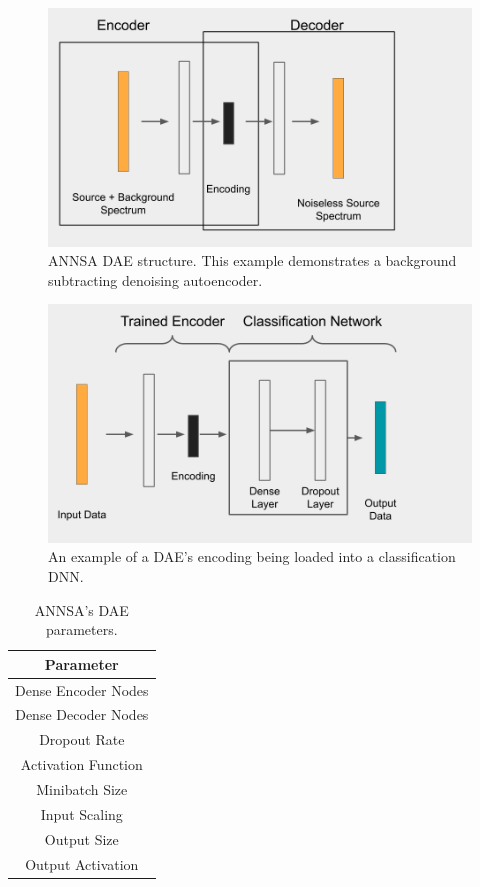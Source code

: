 \begin{figure}[H]
\centering
\includegraphics[trim=0 0 125 0,clip,width=0.8\linewidth]{images/annsa_dae.png}
\caption{ANNSA DAE structure. This example demonstrates a background subtracting denoising autoencoder.}
\label{fig:annsa_dae}
\end{figure}

\begin{figure}[H]
\centering
\includegraphics[trim=0 40 85 0,clip,width=0.8\linewidth]{images/annsa_daednn.png}
\caption{An example of a DAE's encoding being loaded into a classification DNN.}
\label{fig:annsa_daednn}
\end{figure}


\begin{table}[H]
\centering
\caption{ANNSA's DAE parameters.}
\begin{tabular}{c}
\hline
Parameter \\ \hline
Dense Encoder Nodes \\
Dense Decoder Nodes \\
Dropout Rate \\
Activation Function \\
Minibatch Size \\ 
Input Scaling \\
Output Size \\
Output Activation \\ \hline
\end{tabular}
\label{table:annsa_dae_params}
\end{table}



